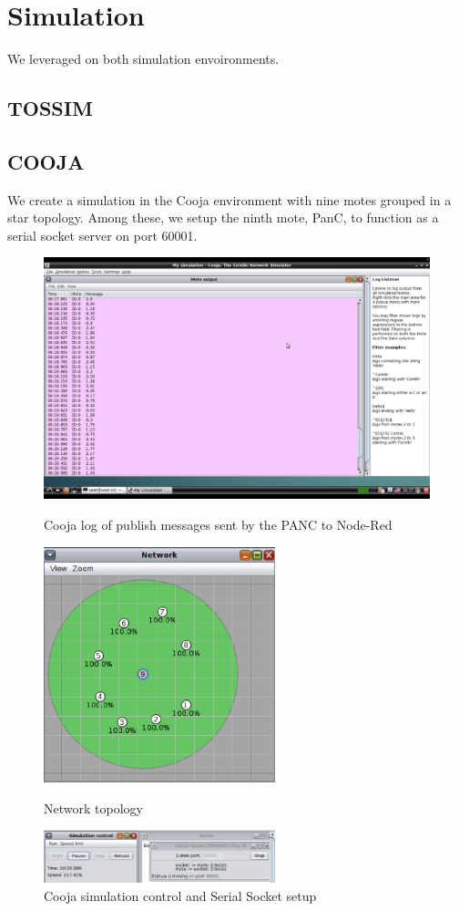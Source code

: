 \documentclass[11pt]{article}
\begin{document}
\section*{Simulation}
We leveraged on both simulation envoironments.
\subsection*{TOSSIM}

\subsection*{COOJA}
We create a simulation in the Cooja environment with nine motes grouped in a star topology. 
Among these, we setup the ninth mote, PanC, to function as a serial socket server on port 60001. 

\begin{figure}[h]
  \centering
  \includegraphics[width=1\textwidth]{images/publish_messages_cooja.png}
  \caption{Cooja log of publish messages sent by the PANC to Node-Red}
  \smallskip
  \includegraphics[width=0.6\textwidth]{images/network.png}
  \caption{Network topology}
  \medskip
  \includegraphics[width=0.6\textwidth]{images/serial_server_socket.png}
  \caption{Cooja simulation control and Serial Socket setup}
\end{figure}
\end{document}
